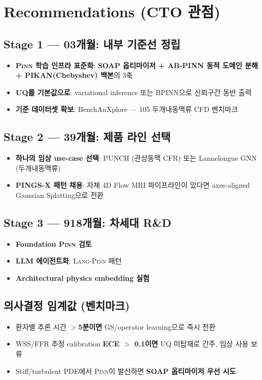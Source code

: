 \documentclass[11pt,a4paper,oneside]{report}
\newcommand{\pinn}{\textsc{Pinn}}
\newcommand{\langpinn}{\textsc{Lang-Pinn}}
\begin{document}
\section{Recommendations (CTO 관점)}

\subsection*{Stage 1 --- 0\textendash 3개월: 내부 기준선 정립}
\begin{itemize}
\item \textbf{\pinn{} 학습 인프라 표준화}: \textbf{SOAP 옵티마이저 + AB-PINN 동적 도메인 분해 + PIKAN(Chebyshev) 백본}의 3축
\item \textbf{UQ를 기본값으로}: variational inference 또는 BPINN으로 신뢰구간 동반 출력
\item \textbf{기준 데이터셋 확보}: BenchAnXplore --- 105 두개내동맥류 CFD 벤치마크
\end{itemize}

\subsection*{Stage 2 --- 3\textendash 9개월: 제품 라인 선택}
\begin{itemize}
\item \textbf{하나의 임상 use-case 선택}: PUNCH (관상동맥 CFR) 또는 Lannelongue GNN (두개내동맥류)
\item \textbf{PINGS-X 패턴 채용}: 자체 4D Flow MRI 파이프라인이 있다면 axes-aligned Gaussian Splatting으로 전환
\end{itemize}

\subsection*{Stage 3 --- 9\textendash 18개월: 차세대 R\&D}
\begin{itemize}
\item \textbf{Foundation \pinn{} 검토}
\item \textbf{LLM 에이전트화}: \langpinn{} 패턴
\item \textbf{Architectural physics embedding 실험}
\end{itemize}

\subsection*{의사결정 임계값 (벤치마크)}
\begin{itemize}
\item 환자별 추론 시간 \textbf{$>$5분이면} GS/operator learning으로 즉시 전환
\item WSS/FFR 추정 calibration \textbf{ECE $>$ 0.1이면} UQ 미탑재로 간주, 임상 사용 보류
\item Stiff/turbulent PDE에서 \pinn{}이 발산하면 \textbf{SOAP 옵티마이저 우선 시도}
\end{itemize}
\end{document}
